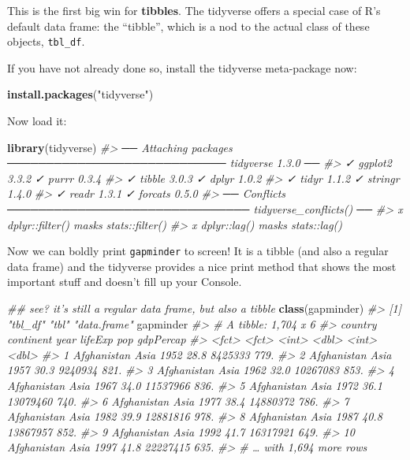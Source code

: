 \documentclass[
]{book}
\newenvironment{Shaded}{\begin{snugshade}}{\end{snugshade}}
\newcommand{\CommentTok}[1]{\textcolor[rgb]{0.56,0.35,0.01}{\textit{#1}}}
\newcommand{\KeywordTok}[1]{\textcolor[rgb]{0.13,0.29,0.53}{\textbf{#1}}}
\newcommand{\NormalTok}[1]{#1}
\newcommand{\StringTok}[1]{\textcolor[rgb]{0.31,0.60,0.02}{#1}}
\begin{document}
This is the first big win for \textbf{tibbles}. The tidyverse offers a special case of R's default data frame: the ``tibble'', which is a nod to the actual class of these objects, \texttt{tbl\_df}.

If you have not already done so, install the tidyverse meta-package now:

\begin{Shaded}
\begin{Highlighting}[]
\KeywordTok{install.packages}\NormalTok{(}\StringTok{"tidyverse"}\NormalTok{)}
\end{Highlighting}
\end{Shaded}

Now load it:

\begin{Shaded}
\begin{Highlighting}[]
\KeywordTok{library}\NormalTok{(tidyverse)}
\CommentTok{#> ── Attaching packages ──────────────────────────── tidyverse 1.3.0 ──}
\CommentTok{#> ✓ ggplot2 3.3.2     ✓ purrr   0.3.4}
\CommentTok{#> ✓ tibble  3.0.3     ✓ dplyr   1.0.2}
\CommentTok{#> ✓ tidyr   1.1.2     ✓ stringr 1.4.0}
\CommentTok{#> ✓ readr   1.3.1     ✓ forcats 0.5.0}
\CommentTok{#> ── Conflicts ─────────────────────────────── tidyverse_conflicts() ──}
\CommentTok{#> x dplyr::filter() masks stats::filter()}
\CommentTok{#> x dplyr::lag()    masks stats::lag()}
\end{Highlighting}
\end{Shaded}

Now we can boldly print \texttt{gapminder} to screen! It is a tibble (and also a regular data frame) and the tidyverse provides a nice print method that shows the most important stuff and doesn't fill up your Console.

\begin{Shaded}
\begin{Highlighting}[]
\CommentTok{## see? it's still a regular data frame, but also a tibble}
\KeywordTok{class}\NormalTok{(gapminder)}
\CommentTok{#> [1] "tbl_df"     "tbl"        "data.frame"}
\NormalTok{gapminder}
\CommentTok{#> # A tibble: 1,704 x 6}
\CommentTok{#>    country     continent  year lifeExp      pop gdpPercap}
\CommentTok{#>    <fct>       <fct>     <int>   <dbl>    <int>     <dbl>}
\CommentTok{#>  1 Afghanistan Asia       1952    28.8  8425333      779.}
\CommentTok{#>  2 Afghanistan Asia       1957    30.3  9240934      821.}
\CommentTok{#>  3 Afghanistan Asia       1962    32.0 10267083      853.}
\CommentTok{#>  4 Afghanistan Asia       1967    34.0 11537966      836.}
\CommentTok{#>  5 Afghanistan Asia       1972    36.1 13079460      740.}
\CommentTok{#>  6 Afghanistan Asia       1977    38.4 14880372      786.}
\CommentTok{#>  7 Afghanistan Asia       1982    39.9 12881816      978.}
\CommentTok{#>  8 Afghanistan Asia       1987    40.8 13867957      852.}
\CommentTok{#>  9 Afghanistan Asia       1992    41.7 16317921      649.}
\CommentTok{#> 10 Afghanistan Asia       1997    41.8 22227415      635.}
\CommentTok{#> # … with 1,694 more rows}
\end{Highlighting}
\end{Shaded}
\end{document}
